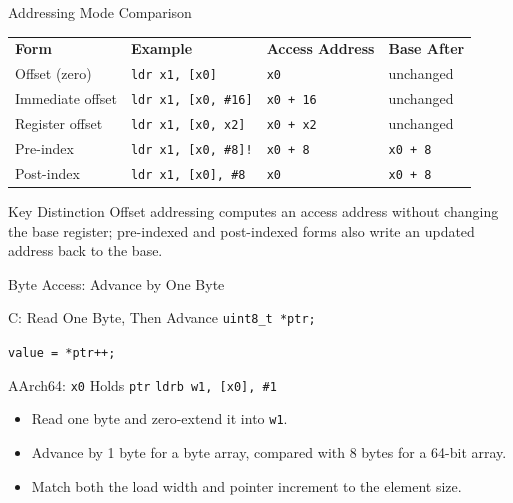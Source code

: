 \documentclass[aspectratio=169,11pt,t]{beamer}
\newcommand{\code}[1]{\texttt{#1}}
\begin{document}
\begin{frame}{Addressing Mode Comparison}
\begin{center}
\small
\renewcommand{\arraystretch}{1.14}
\begin{tabular}{>{\raggedright\arraybackslash}m{2.6cm} >{\raggedright\arraybackslash}m{4.2cm} >{\raggedright\arraybackslash}m{2.7cm} >{\raggedright\arraybackslash}m{2.4cm}}
\rowcolor{navy}
{\color{white}\bfseries Form} &
{\color{white}\bfseries Example} &
{\color{white}\bfseries Access Address} &
{\color{white}\bfseries Base After} \\
\rowcolor{softgray}
Offset (zero) &
\code{ldr x1, [x0]} &
\code{x0} &
unchanged \\
\rowcolor{white}
Immediate offset &
\code{ldr x1, [x0, \#16]} &
\code{x0 + 16} &
unchanged \\
\rowcolor{softgray}
Register offset &
\code{ldr x1, [x0, x2]} &
\code{x0 + x2} &
unchanged \\
\rowcolor{white}
Pre-index &
\code{ldr x1, [x0, \#8]!} &
\code{x0 + 8} &
\code{x0 + 8} \\
\rowcolor{softgray}
Post-index &
\code{ldr x1, [x0], \#8} &
\code{x0} &
\code{x0 + 8} \\
\end{tabular}
\end{center}
\vspace{0.2cm}
\begin{block}{Key Distinction}
Offset addressing computes an access address without changing the base register; pre-indexed and post-indexed forms also write an updated address back to the base.
\end{block}
\end{frame}




\begin{frame}{Byte Access: Advance by One Byte}
\begin{block}{C: Read One Byte, Then Advance}
\code{uint8\_t *ptr;}\par
\code{value = *ptr++;}
\end{block}
\begin{block}{AArch64: \code{x0} Holds \code{ptr}}
\code{ldrb w1, [x0], \#1}
\end{block}
\begin{itemize}
\item Read one byte and zero-extend it into \code{w1}.
\item Advance by 1 byte for a byte array, compared with 8 bytes for a 64-bit array.
\item Match both the load width and pointer increment to the element size.
\end{itemize}
\end{frame}
\end{document}
